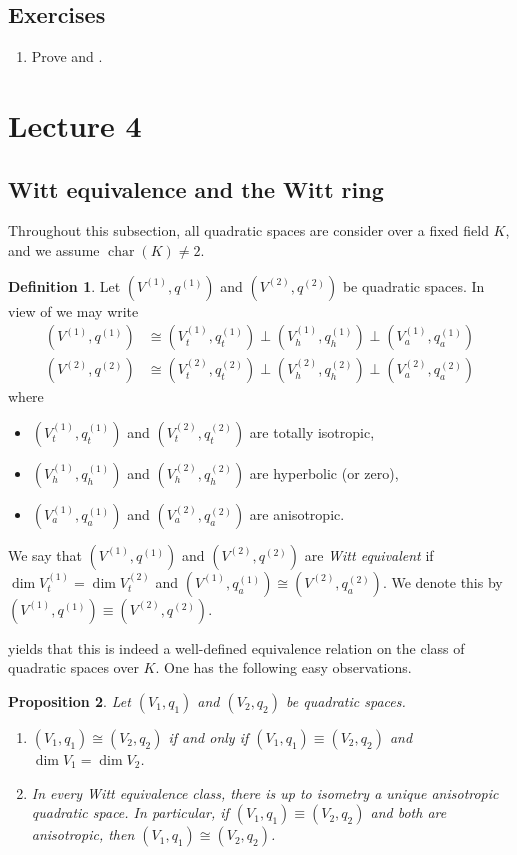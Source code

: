 \documentclass[12pt, leqno, british]{amsart}
\theoremstyle{definition}
\newtheorem{defi}{Definition}[subsection]
\theoremstyle{plain}
\newtheorem{prop}[defi]{Proposition}
\theoremstyle{remark}
\DeclareMathOperator{\charac}{char}
\begin{document}
\subsection{Exercises}
\begin{enumerate}
\item Prove  and .
\end{enumerate}

\section{Lecture 4}
\subsection{Witt equivalence and the Witt ring}
Throughout this subsection, all quadratic spaces are consider over a fixed field $K$, and we assume $\charac(K) \neq 2$.
\begin{defi}
Let $(V^{(1)}, q^{(1)})$ and $(V^{(2)}, q^{(2)})$ be quadratic spaces.
In view of  we may write
\begin{align*}
(V^{(1)}, q^{(1)}) &\cong (V_t^{(1)}, q_t^{(1)}) \perp (V_h^{(1)}, q_h^{(1)}) \perp (V_a^{(1)}, q_a^{(1)}) \\
(V^{(2)}, q^{(2)}) &\cong (V_t^{(2)}, q_t^{(2)}) \perp (V_h^{(2)}, q_h^{(2)}) \perp (V_a^{(2)}, q_a^{(2)})
\end{align*}
where
\begin{itemize}
\item $(V_t^{(1)}, q_t^{(1)})$ and $(V_t^{(2)}, q_t^{(2)})$ are totally isotropic,
\item $(V_h^{(1)}, q_h^{(1)})$ and $(V_h^{(2)}, q_h^{(2)})$ are hyperbolic (or zero),
\item $(V_a^{(1)}, q_a^{(1)})$ and $(V_a^{(2)}, q_a^{(2)})$ are anisotropic.
\end{itemize}
We say that $(V^{(1)}, q^{(1)})$ and $(V^{(2)}, q^{(2)})$ are \emph{Witt equivalent} if $\dim V_t^{(1)}  =\dim V_t^{(2)}$ and $(V^{(1)}, q_a^{(1)}) \cong (V^{(2)}, q_a^{(2)})$.
We denote this by $(V^{(1)}, q^{(1)}) \equiv (V^{(2)}, q^{(2)})$.
\end{defi}
 yields that this is indeed a well-defined equivalence relation on the class of quadratic spaces over $K$.
One has the following easy observations.
\begin{prop}
Let $(V_1, q_1)$ and $(V_2, q_2)$ be quadratic spaces.
\begin{enumerate}
\item $(V_1, q_1) \cong (V_2, q_2)$ if and only if $(V_1, q_1) \equiv (V_2, q_2)$ and $\dim V_1 = \dim V_2$.
\item In every Witt equivalence class, there is up to isometry a unique anisotropic quadratic space.
In particular, if $(V_1, q_1) \equiv (V_2, q_2)$ and both are anisotropic, then $(V_1, q_1) \cong (V_2, q_2)$.
\end{enumerate}
\end{prop}
\end{document}
